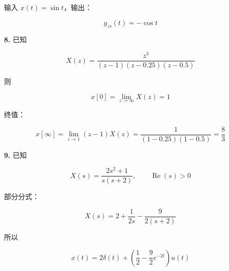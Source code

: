 \documentclass[11pt]{ctexart}
\begin{document}
输入 \(x(t)=\sin t\)，输出：\par



\[

   y_{zs}(t)=-\cos t

   \]



\noindent\textbf{8.} 已知\par



\[

   X(z)=\frac{z^3}{(z-1)(z-0.25)(z-0.5)}

   \]



则\par



\[

   x[0]=\lim_{z\to\infty}X(z)=1

   \]



终值：\par



\[

   x[\infty]=\lim_{z\to1}(z-1)X(z)

   =\frac{1}{(1-0.25)(1-0.5)}

   =\frac{8}{3}

   \]



\noindent\textbf{9.} 已知\par



\[

   X(s)=\frac{2s^2+1}{s(s+2)},\qquad \operatorname{Re}(s)>0

   \]



部分分式：\par



\[

   X(s)=2+\frac{1}{2s}-\frac{9}{2(s+2)}

   \]



所以\par



\[

   x(t)=2\delta(t)+\left(\frac12-\frac92e^{-2t}\right)u(t)

   \]
\end{document}
